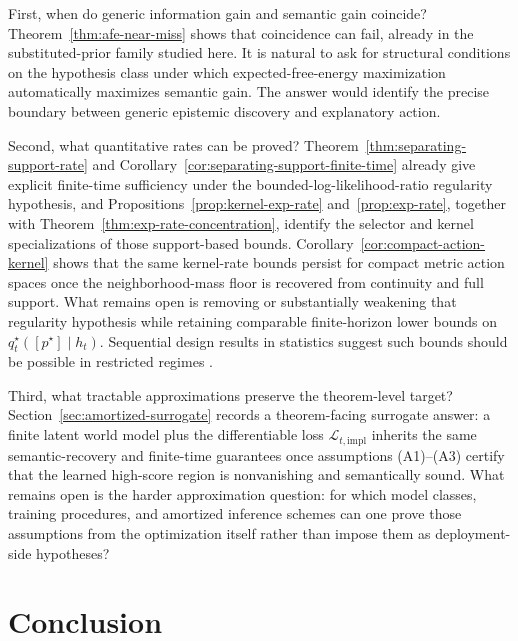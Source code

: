 \documentclass[11pt]{article}
\theoremstyle{definition}
\theoremstyle{remark}
\begin{document}
First, when do generic information gain and semantic gain coincide? Theorem~\ref{thm:afe-near-miss} shows that coincidence can fail, already in the substituted-prior family studied here. It is natural to ask for structural conditions on the hypothesis class under which expected-free-energy maximization automatically maximizes semantic gain. The answer would identify the precise boundary between generic epistemic discovery and explanatory action.

Second, what quantitative rates can be proved? Theorem~\ref{thm:separating-support-rate} and Corollary~\ref{cor:separating-support-finite-time} already give explicit finite-time sufficiency under the bounded-log-likelihood-ratio regularity hypothesis, and Propositions~\ref{prop:kernel-exp-rate} and~\ref{prop:exp-rate}, together with Theorem~\ref{thm:exp-rate-concentration}, identify the selector and kernel specializations of those support-based bounds. Corollary~\ref{cor:compact-action-kernel} shows that the same kernel-rate bounds persist for compact metric action spaces once the neighborhood-mass floor is recovered from continuity and full support. What remains open is removing or substantially weakening that regularity hypothesis while retaining comparable finite-horizon lower bounds on $q_t^\star([p^\star]\mid h_t)$. Sequential design results in statistics suggest such bounds should be possible in restricted regimes \citep{Chernoff1959,BoxHill1967}.

Third, what tractable approximations preserve the theorem-level target? Section~\ref{sec:amortized-surrogate} records a theorem-facing surrogate answer: a finite latent world model plus the differentiable loss $\mathcal L_{t,\mathrm{impl}}$ inherits the same semantic-recovery and finite-time guarantees once assumptions \textup{(A1)--(A3)} certify that the learned high-score region is nonvanishing and semantically sound. What remains open is the harder approximation question: for which model classes, training procedures, and amortized inference schemes can one prove those assumptions from the optimization itself rather than impose them as deployment-side hypotheses?

\section{Conclusion}
\label{sec:conclusion}
\end{document}
